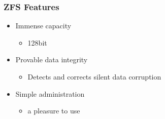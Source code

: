 % 
% 
% 
% 
% 
% 
% 
\begin{frame}[fragile]
    \frametitle{ZFS Features}
    \begin{itemize}
        \item Immense capacity
        \begin{itemize}
            \item 128bit
        \end{itemize}
        \item Provable data integrity
        \begin{itemize}
            \item Detects and corrects silent data corruption
        \end{itemize}
        \item Simple administration
        \begin{itemize}
            \item a pleasure to use
        \end{itemize}
    \end{itemize}
\end{frame}
